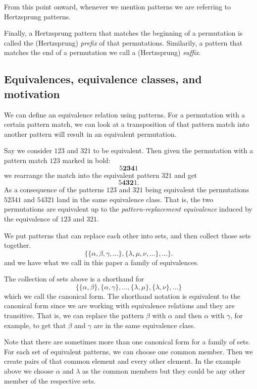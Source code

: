 \documentclass[a4paper, 11pt, english]{article}
\theoremstyle{definition}
\begin{document}
From this point onward, whenever we mention patterns we are referring to
Hertzsprung patterns.

Finally, a Hertzsprung pattern that matches the beginning of a permutation is
called the (Hertzsprung) \emph{prefix} of that permutations. Similarily, a pattern
that matches the end of a permutation we call a (Hertzsprung) \emph{suffix}.

\subsection{Equivalences, equivalence classes, and motivation}
We can define an equivalence relation using patterns. For a permutation with a certain pattern
match, we can look at a transposition of that pattern match into another pattern will result in an
equivalent permutation. 

Say we consider $123$ and $321$ to be equivalent. Then given the
permutation with a pattern match $123$ marked in bold:
\[
  5\bm{234}1
\]
we rearrange the match into the equivalent pattern $321$ and get
\[
  5\bm{432}1.
\]
As a consequence of the patterns $123$ and $321$ being equivalent the permutations $52341$ and
$54321$ land in the same equivalence class. That is, the two permutations are equivalent up to the
\emph{pattern-replacement equivalence} induced by the equivalence of $123$ and $321$.

We put patterns that can replace each other into sets, and then collect those sets together. 
\[
    \{ \{\alpha, \beta, \gamma, \dots \}, \{\lambda, \mu, \nu, \dots \}, \dots
    \}.
\]
and we have what we call in this paper a family of equivalences.

The collection of sets above is a shorthand for
\[
    \{ \{ \alpha, \beta \}, \{ \alpha, \gamma \}, \dots, \{ \lambda, \mu \}, \{
        \lambda, \nu \}, \dots \}
\] 
which we call the canonical form. The shorthand notation is equivalent to the canonical form since
we are working with equivalence relations and they are transitive.
That is, we can replace the pattern $\beta$ with $\alpha$ and then $\alpha$ with $\gamma$, for
example, to get that $\beta$ and $\gamma$ are in the same equivalence class.

Note that there are sometimes more than one canonical form for a family of sets. For each 
set of equivalent patterns, we can choose one common member. Then we create pairs of that common
element and every other element. In the example above we choose $\alpha$ and $\lambda$ as the common members
but they could be any other member of the respective sets.
\end{document}
